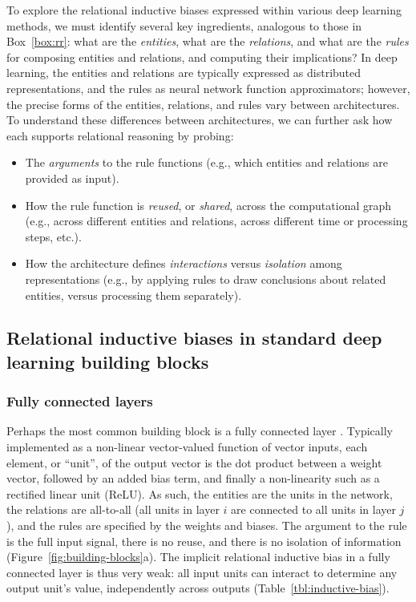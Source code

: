 To explore the relational inductive biases expressed within various deep learning methods, we must identify several key ingredients, analogous to those in Box~\ref{box:rr}: what are the \emph{entities}, what are the \emph{relations}, and what are the \emph{rules} for composing entities and relations, and computing their implications?
In deep learning, the entities and relations are typically expressed as distributed representations, and the rules as neural network function approximators; however, the precise forms of the entities, relations, and rules vary between architectures.
To understand these differences between architectures, we can further ask how each supports relational reasoning by probing:
\begin{itemize}[noitemsep]
\item The \emph{arguments} to the rule functions (e.g., which entities and relations are provided as input).
\item How the rule function is \emph{reused}, or \emph{shared}, across the computational graph (e.g., across different entities and relations, across different time or processing steps, etc.).
\item How the architecture defines \emph{interactions} versus \emph{isolation} among representations (e.g., by applying rules to draw conclusions about related entities, versus processing them separately).
\end{itemize}

\subsection{Relational inductive biases in standard deep learning building blocks}

\subsubsection{Fully connected layers}

Perhaps the most common building block is a fully connected layer \citep{rosenblatt1961principles}. Typically implemented as a non-linear vector-valued function of vector inputs, each element, or ``unit'', of the output vector is the dot product between a weight vector, followed by an added bias term, and finally a non-linearity such as a rectified linear unit (ReLU). As such, the entities are the units in the network, the relations are all-to-all (all units in layer $i$ are connected to all units in layer $j$), and the rules are specified by the weights and biases. The argument to the rule is the full input signal, there is no reuse, and there is no isolation of information (Figure~\ref{fig:building-blocks}a). The implicit relational inductive bias in a fully connected layer is thus very weak: all input units can interact to determine any output unit's value, independently across outputs (Table~\ref{tbl:inductive-bias}).

